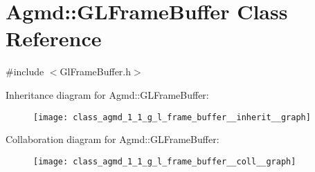 \hypertarget{class_agmd_1_1_g_l_frame_buffer}{\section{Agmd\+:\+:G\+L\+Frame\+Buffer Class Reference}
\label{class_agmd_1_1_g_l_frame_buffer}
}


{\ttfamily \#include $<$Gl\+Frame\+Buffer.\+h$>$}



Inheritance diagram for Agmd\+:\+:G\+L\+Frame\+Buffer\+:\nopagebreak
\begin{figure}[H]
\begin{center}
\leavevmode
\texttt{[image: class\_agmd\_1\_1\_g\_l\_frame\_buffer\_\_inherit\_\_graph]}
\end{center}
\end{figure}


Collaboration diagram for Agmd\+:\+:G\+L\+Frame\+Buffer\+:\nopagebreak
\begin{figure}[H]
\begin{center}
\leavevmode
\texttt{[image: class\_agmd\_1\_1\_g\_l\_frame\_buffer\_\_coll\_\_graph]}
\end{center}
\end{figure}
